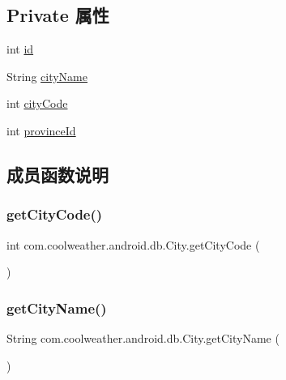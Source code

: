 \subsection*{Private 属性}
\begin{DoxyCompactItemize}
\item 
int \mbox{\hyperlink{classcom_1_1coolweather_1_1android_1_1db_1_1_city_a26cc93496554fb90b788f7f229e9266d}{id}}
\item 
String \mbox{\hyperlink{classcom_1_1coolweather_1_1android_1_1db_1_1_city_a0aa025df84b3ee11074a055d13e8240b}{city\+Name}}
\item 
int \mbox{\hyperlink{classcom_1_1coolweather_1_1android_1_1db_1_1_city_a65f3070cb6f6595e46168d7fef4ab105}{city\+Code}}
\item 
int \mbox{\hyperlink{classcom_1_1coolweather_1_1android_1_1db_1_1_city_aa37bb61864bed09cdc38fda357a77416}{province\+Id}}
\end{DoxyCompactItemize}


\subsection{成员函数说明}
\mbox{\label{classcom_1_1coolweather_1_1android_1_1db_1_1_city_a4e1b3cfeb6e870603c4de09066751e46}} 
\subsubsection{\texorpdfstring{getCityCode()}{getCityCode()}}
{\footnotesize\ttfamily int com.\+coolweather.\+android.\+db.\+City.\+get\+City\+Code (\begin{DoxyParamCaption}{ }\end{DoxyParamCaption})\hspace{0.3cm}{\ttfamily [inline]}}

\mbox{\label{classcom_1_1coolweather_1_1android_1_1db_1_1_city_ab3c66bcec789c71e46f2cbb5b2c1ae17}} 
\subsubsection{\texorpdfstring{getCityName()}{getCityName()}}
{\footnotesize\ttfamily String com.\+coolweather.\+android.\+db.\+City.\+get\+City\+Name (\begin{DoxyParamCaption}{ }\end{DoxyParamCaption})\hspace{0.3cm}{\ttfamily [inline]}}

